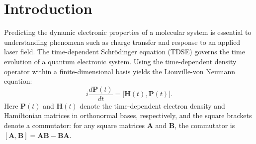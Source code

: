 \documentclass[10pt]{article}
\begin{document}


\section{Introduction}\label{sec1}

Predicting the dynamic electronic properties of a molecular system is essential to understanding phenomena such as charge transfer and response to an applied laser field. The time-dependent Schr\"{o}dinger equation (TDSE) governs the time evolution of a quantum electronic system. %
Using the time-dependent density operator within a finite-dimensional basis yields the Liouville-von Neumann equation:%
\begin{equation}
\label{eqn:LiNe}
i\frac{d \mathbf{P}(t)}{d t} =  \big [   \mathbf{H}(t), \mathbf{P}(t) \big].
\end{equation}
Here $\mathbf{P}(t)$ and $\mathbf{H}(t)$ denote the time-dependent electron density and Hamiltonian matrices in orthonormal bases, respectively, and the square brackets denote a commutator: for any square matrices $\mathbf{A}$ and $\mathbf{B}$, the commutator is $[\mathbf{A},\mathbf{B}] = \mathbf{A}\mathbf{B} - \mathbf{B} \mathbf{A}$.
\end{document}
